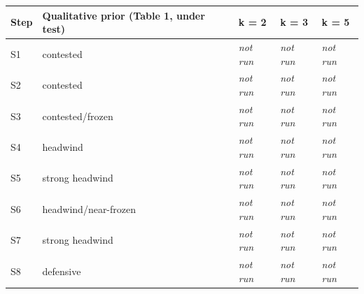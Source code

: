 \begin{longtable}[]{@{}
  >{\raggedright\arraybackslash}p{}
  >{\raggedright\arraybackslash}p{}
  >{\raggedright\arraybackslash}p{}
  >{\raggedright\arraybackslash}p{}
  >{\raggedright\arraybackslash}p{}@{}}
\toprule\noalign{}
\begin{minipage}[b]{\linewidth}\raggedright
Step
\end{minipage} & \begin{minipage}[b]{\linewidth}\raggedright
Qualitative prior (Table 1, under test)
\end{minipage} & \begin{minipage}[b]{\linewidth}\raggedright
k = 2
\end{minipage} & \begin{minipage}[b]{\linewidth}\raggedright
k = 3
\end{minipage} & \begin{minipage}[b]{\linewidth}\raggedright
k = 5
\end{minipage} \\
\midrule\noalign{}
\endhead
\bottomrule\noalign{}
\endlastfoot
S1 & contested & \emph{not run} & \emph{not run} & \emph{not run} \\
S2 & contested & \emph{not run} & \emph{not run} & \emph{not run} \\
S3 & contested/frozen & \emph{not run} & \emph{not run} & \emph{not run} \\
S4 & headwind & \emph{not run} & \emph{not run} & \emph{not run} \\
S5 & strong headwind & \emph{not run} & \emph{not run} & \emph{not run} \\
S6 & headwind/near-frozen & \emph{not run} & \emph{not run} & \emph{not run} \\
S7 & strong headwind & \emph{not run} & \emph{not run} & \emph{not run} \\
S8 & defensive & \emph{not run} & \emph{not run} & \emph{not run} \\
\end{longtable}


